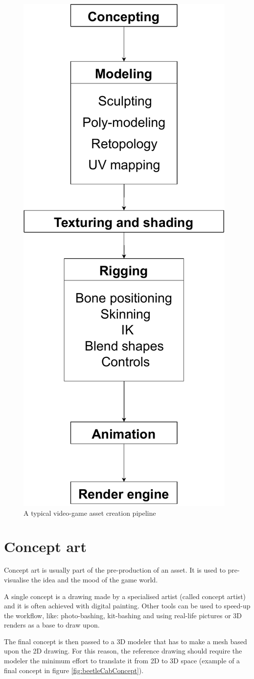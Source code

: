 \documentclass[12pt,twoside]{report}
\begin{document}
\begin{figure}[hp]
    \centering
    \includegraphics[width=30ex]{graphics/workflow_game.pdf}
    \caption{A typical video-game asset creation pipeline}
    \label{fig:assetCreationPipeline}
\end{figure}

\section{Concept art}
\label{sec:conceptArt}
Concept art is usually part of the pre-production of an asset. It is used to pre-visualise the idea and the mood of the game world.

A single concept is a drawing made by a specialised artist (called concept artist) and it is often achieved with digital painting. Other tools can be used to speed-up the workflow, like: photo-bashing, kit-bashing and using real-life pictures or 3D renders as a base to draw upon.

The final concept is then passed to a 3D modeler that has to make a mesh based upon the 2D drawing. For this reason, the reference drawing should require the modeler the minimum effort to translate it from 2D to 3D space (example of a final concept in figure \ref{fig:beetleCabConcept}).
\end{document}
